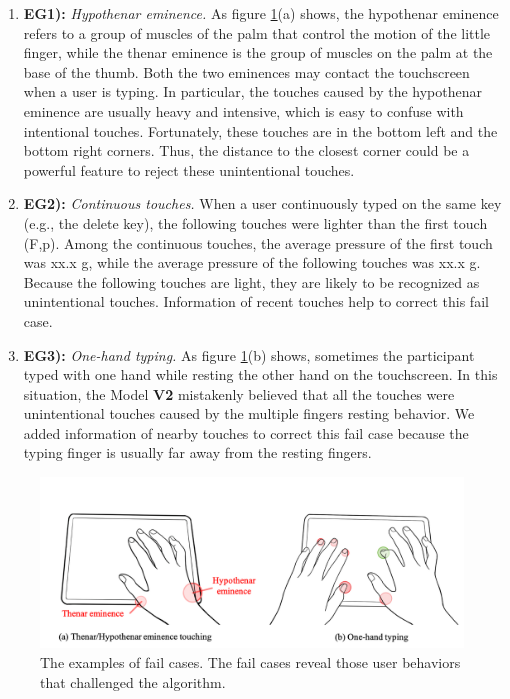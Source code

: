 \begin{enumerate}
	\item{\textbf{EG1):} \emph{Hypothenar eminence.} As figure \ref{fig:fail_case_examples}(a) shows, the hypothenar eminence refers to a group of muscles of the palm that control the motion of the little finger, while the thenar eminence is the group of muscles on the palm at the base of the thumb. Both the two eminences may contact the touchscreen when a user is typing. In particular, the touches caused by the hypothenar eminence are usually heavy and intensive, which is easy to confuse with intentional touches. Fortunately, these touches are in the bottom left and the bottom right corners. Thus, the distance to the closest corner could be a powerful feature to reject these unintentional touches.}
	\item{\textbf{EG2):} \emph{Continuous touches.} When a user continuously typed on the same key (e.g., the delete key), the following touches were lighter than the first touch (F,p). Among the continuous touches, the average pressure of the first touch was xx.x g, while the average pressure of the following touches was xx.x g. Because the following touches are light, they are likely to be recognized as unintentional touches. Information of recent touches help to correct this fail case.}
	\item{\textbf{EG3):} \emph{One-hand typing.} As figure \ref{fig:fail_case_examples}(b) shows, sometimes the participant typed with one hand while resting the other hand on the touchscreen. In this situation, the Model \textbf{V2} mistakenly believed that all the touches were unintentional touches caused by the multiple fingers resting behavior. We added information of nearby touches to correct this fail case because the typing finger is usually far away from the resting fingers.}
\end{enumerate}

\begin{figure}[!tbh]
	\includegraphics[width=1.0\linewidth]{figures/fail_case_examples.png}
	\centering
	\caption{The examples of fail cases. The fail cases reveal those user behaviors that challenged the algorithm.}
	\label{fig:fail_case_examples}
\end{figure}

